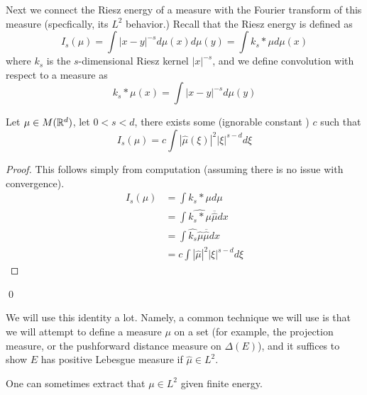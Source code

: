 Next we connect the Riesz energy of a measure with the Fourier transform of this measure (specfically, its $L^2$ behavior.) Recall that the Riesz energy is defined as 
\begin{equation*}
    I_s(\mu)=\int |x-y|^{-s}d\mu(x)d\mu(y)=\int k_s\ast \mu d\mu(x)
\end{equation*}
where $k_s$ is the $s$-dimensional Riesz kernel $|x|^{-s}$, and we define convolution with respect to a measure as 
\begin{equation*}
    k_s\ast\mu(x)=\int |x-y|^{-s}d\mu(y)
\end{equation*}
\begin{proposition}
    Let $\mu\in M(\mathbb{R}^d)$, let $0<s<d$, there exists some (ignorable constant ) $c$ such that 
    \begin{equation*}
        I_s(\mu)=c\int|\hat{\mu}(\xi)|^2|\xi|^{s-d}d\xi
    \end{equation*}
\end{proposition}
\begin{proof}
    This follows simply from computation (assuming there is no issue with convergence).
    \begin{align*}
        I_s(\mu)&=\int k_s\ast \mu d\mu\\
        &=\int \widehat{k_s\ast\mu}\overline{\hat{\mu}}dx\\
        &=\int \hat{k_s}\hat{\mu}\overline{\hat{\mu}}dx\\
        &=c\int |\hat{\mu}|^2|\xi|^{s-d}d\xi
    \end{align*}
\end{proof}
\qed

We will use this identity a lot. Namely, a common technique we will use is that we will attempt to define a measure $\mu$ on a set (for example, the projection measure, or the pushforward distance measure on $\Delta(E)$), and it suffices to show $E$ has positive Lebesgue measure if $\hat{\mu}\in L^2$.
\begin{note}
    One can sometimes extract that $\mu\in L^2$ given finite energy.
\end{note}

